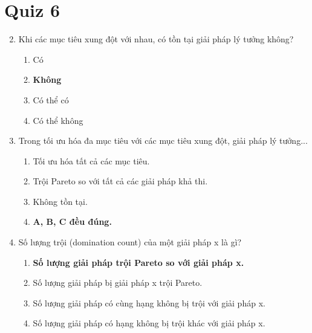 \documentclass{book}
\begin{document}
\section{Quiz 6}
\begin{enumerate}
    \setcounter{enumi}{1} %
    \item Khi các mục tiêu xung đột với nhau, có tồn tại giải pháp lý tưởng không?
    \begin{multicols}{2}
        \begin{enumerate}[label=\Alph*]
            \item Có
            \item \textbf{Không}
            \item Có thể có
            \item Có thể không
        \end{enumerate}
    \end{multicols}

    \item Trong tối ưu hóa đa mục tiêu với các mục tiêu xung đột, giải pháp lý tưởng...
    \begin{multicols}{2}
        \begin{enumerate}[label=\Alph*]
            \item Tối ưu hóa tất cả các mục tiêu.
            \item Trội Pareto so với tất cả các giải pháp khả thi.
            \item Không tồn tại.
            \item \textbf{A, B, C đều đúng.}
        \end{enumerate}
    \end{multicols}

    \item Số lượng trội (domination count) của một giải pháp x là gì?
    \begin{multicols}{2}
        \begin{enumerate}[label=\Alph*]
            \item \textbf{Số lượng giải pháp trội Pareto so với giải pháp x.}
            \item Số lượng giải pháp bị giải pháp x trội Pareto.
            \item Số lượng giải pháp có cùng hạng không bị trội với giải pháp x.
            \item Số lượng giải pháp có hạng không bị trội khác với giải pháp x.
        \end{enumerate}
    \end{multicols}


\end{enumerate}
\end{document}
